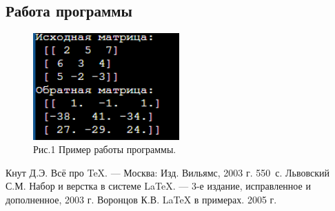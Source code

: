\documentclass[12pt,a4paper]{scrartcl}
\begin{document}
\subsection{Работа программы} 



\begin{figure}
  \begin{center}
    \includegraphics[width=0.5\textwidth]{matrix.jpg}
  \end{center}
  \caption{Рис.1  Пример работы программы.}\label{fig:ex}
\end{figure}

\newpage
\begin{thebibliography}{9}
Кнут Д.Э. Всё про \TeX. \newblock --- Москва: Изд. Вильямс, 2003 г. 550~с.
Львовский С.М. Набор и верстка в системе \LaTeX{}. \newblock --- 3-е издание, исправленное и дополненное, 2003 г.
Воронцов К.В. \LaTeX{} в примерах. 2005 г.
\end{thebibliography}
\end{document}

